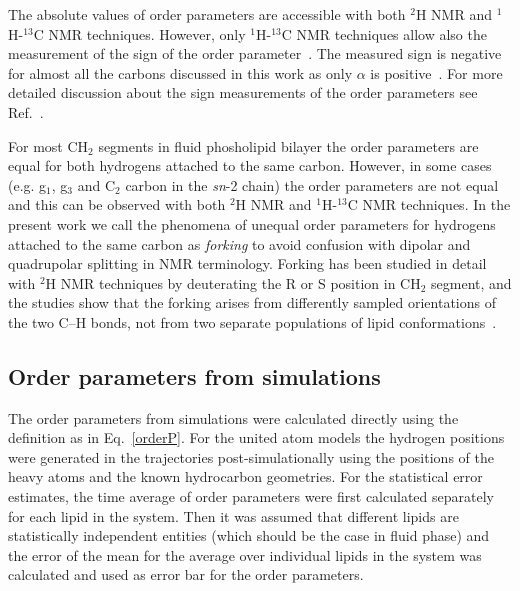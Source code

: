 \documentclass[journal=jacsat,manuscript=article]{achemso}
\begin{document}
The absolute values of order parameters are accessible with both $^2$H NMR and $^1$H-$^{13}$C NMR techniques. 
However, only $^1$H-$^{13}$C NMR techniques allow also the measurement of the sign of the order parameter~\cite{hong95a,hong95b,gross97}. 
The measured sign is negative for almost all the carbons discussed in this work as only $\alpha$ is positive~\cite{hong95a,hong95b,gross97}. 
For more detailed discussion about the sign measurements of the order parameters see Ref.~. 

For most CH$_2$ segments in fluid phosholipid bilayer the order parameters are equal for both hydrogens attached to the same carbon.
However, in some cases (e.g. g$_1$, g$_3$ and  C$_2$ carbon in the \textit{sn}-2 chain) the order parameters are not equal and this 
can be observed with both $^2$H NMR and $^1$H-$^{13}$C NMR techniques. In the present work we call the phenomena of unequal order parameters 
for hydrogens attached to the same carbon as {\it forking} to avoid confusion with dipolar and quadrupolar splitting in NMR terminology. 
Forking has been studied in detail with $^2$H NMR techniques by deuterating the R or S position in CH$_2$ segment, and
the studies show that the forking arises from differently sampled orientations of the two C--H bonds, not from two 
separate populations of lipid conformations~\cite{engel81,gally81}.



\subsection{Order parameters from simulations}
The order parameters from simulations were calculated directly using the definition as in Eq.~\ref{orderP}.
For the united atom models the hydrogen positions were generated 
in the trajectories post-simulationally using the positions of the heavy atoms and the known hydrocarbon geometries.
For the statistical error estimates, the time average of order parameters were first calculated separately
for each lipid in the system. Then it was assumed that different lipids are statistically independent 
entities (which should be the case in fluid phase) and the error of the mean for the average over individual 
lipids in the system was calculated and used as error bar for the order parameters.
\end{document}
